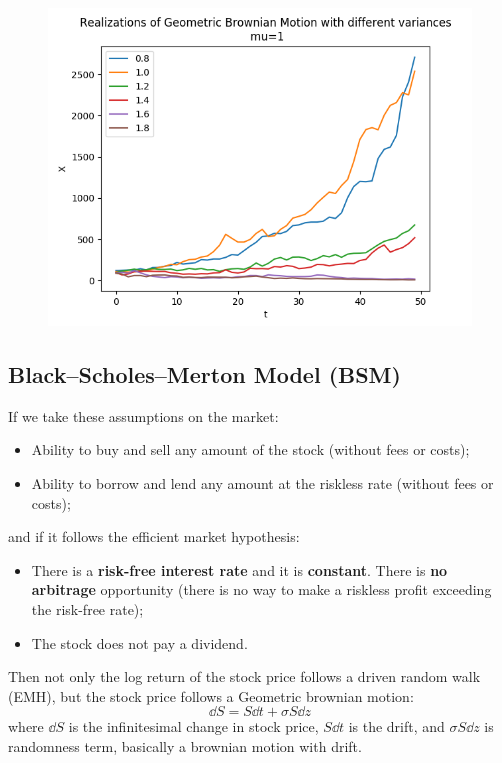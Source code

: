 \begin{figure} [H]
    \centering
    \includegraphics[width=0.75\linewidth]{img/GBM.png}
\end{figure}

\subsection{Black--Scholes--Merton Model (BSM)} 
If we take these assumptions on the market:
\begin{itemize}
    \item Ability to buy and sell any amount of the stock (without fees or costs);
    \item Ability to borrow and lend any amount at the riskless rate (without fees or costs);
    \end{itemize}
    and if it follows the efficient market hypothesis:
    \begin{itemize}
    \item There is a \textbf{risk-free interest rate} and it is \textbf{constant}. There is \textbf{no arbitrage} opportunity (there is no way to make a riskless profit exceeding the risk-free rate);
    \item The stock does not pay a dividend.
    \end{itemize}
Then not only the log return of the stock price follows a driven random walk (EMH), but the stock price follows a Geometric brownian motion:
\begin{equation*}
    \dd S = S \dd t + \sigma S \dd z
\end{equation*}
where $\dd S$ is the infinitesimal change in stock price, $S \dd t$ is the drift, and $\sigma S \dd z$ is randomness term, basically a brownian motion with drift.\\

